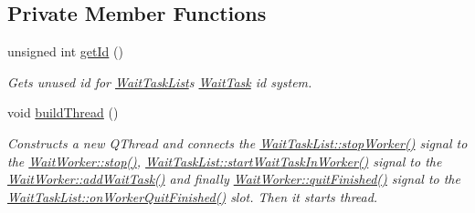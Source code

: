 \subsection*{Private Member Functions}
\begin{DoxyCompactItemize}
\item 
unsigned int \hyperlink{class_wait_task_list_a6d38013814172b4f3de755b455e2230e}{get\+Id} ()
\begin{DoxyCompactList}\small\item\em Gets unused id for \hyperlink{class_wait_task_list}{Wait\+Task\+List}\textquotesingle{}s \hyperlink{class_wait_task}{Wait\+Task} id system. \end{DoxyCompactList}\item 
\hypertarget{class_wait_task_list_ad912d65f84926ef852531a261d9e33f4}{}void \hyperlink{class_wait_task_list_ad912d65f84926ef852531a261d9e33f4}{build\+Thread} ()\label{class_wait_task_list_ad912d65f84926ef852531a261d9e33f4}

\begin{DoxyCompactList}\small\item\em Constructs a new Q\+Thread and connects the \hyperlink{class_wait_task_list_a2839e0820f114d0d8e3509aa9b9a8688}{Wait\+Task\+List\+::stop\+Worker()} signal to the \hyperlink{class_wait_worker_af01864effa7662c8261128ff12fb922d}{Wait\+Worker\+::stop()}, \hyperlink{class_wait_task_list_a1a0af6e55c2eca825e8c31f0ace72305}{Wait\+Task\+List\+::start\+Wait\+Task\+In\+Worker()} signal to the \hyperlink{class_wait_worker_adaff9ea88795fa9d902711c1952828cd}{Wait\+Worker\+::add\+Wait\+Task()} and finally \hyperlink{class_wait_worker_a5f65bc5e4691e9542afef8df55bf27be}{Wait\+Worker\+::quit\+Finished()} signal to the \hyperlink{class_wait_task_list_acb4be74c64bd3df403657f625384f453}{Wait\+Task\+List\+::on\+Worker\+Quit\+Finished()} slot. Then it starts thread. \end{DoxyCompactList}\end{DoxyCompactItemize}
